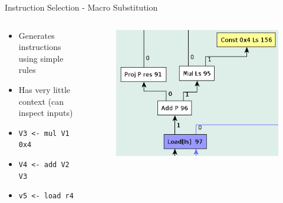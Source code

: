 \documentclass[en,16:9]{sdqbeamer}
\begin{document}
\begin{frame}{Instruction Selection - Macro Substitution}
	\begin{columns}
		\begin{column}{0.5\textwidth}
			\begin{itemize}
				\item Generates instructions using simple rules
				\item Has very little context (can inspect inputs)
				\vspace{3em}
				\item \texttt{V3 <- mul V1 0x4}
				\item \texttt{V4 <- add V2 V3}
				\item \texttt{v5 <- load r4}
			\end{itemize}
		\end{column}

		\begin{column}{0.5\textwidth}
			\begin{figure}
				\centering
				\includegraphics[scale=0.3]{images/instruction-selection.png}
			\end{figure}
		\end{column}
	\end{columns}
\end{frame}
\end{document}
